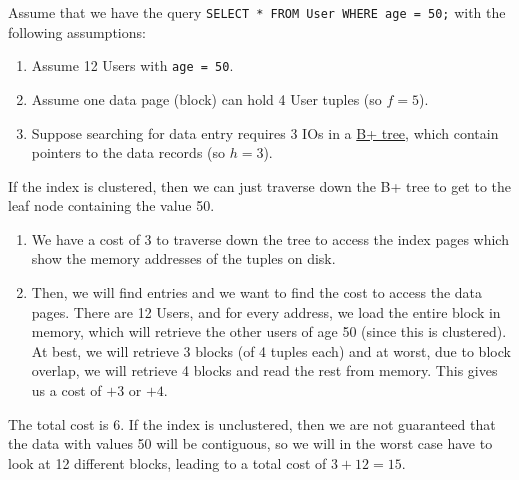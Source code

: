   \begin{example}
    \label{ex:choosing-an-index-for-an-equality-query}
    Assume that we have the query \texttt{SELECT * FROM User WHERE age = 50;} with the following assumptions: 
    \begin{enumerate}
      \item Assume 12 Users with \texttt{age = 50}. 
      \item Assume one data page (block) can hold 4 User tuples (so $f = 5$). 
      \item Suppose searching for data entry requires 3 IOs in a \hyperref[def:b-tree-2]{B+ tree}, which contain pointers to the data records (so $h = 3$). 
    \end{enumerate}

    If the index is clustered, then we can just traverse down the B+ tree to get to the leaf node containing the value 50. 
    \begin{enumerate}
      \item We have a cost of 3 to traverse down the tree to access the index pages which show the memory addresses of the tuples on disk. 

      \item Then, we will find entries and we want to find the cost to access the data pages. There are 12 Users, and for every address, we load the entire block in memory, which will retrieve the other users of age 50 (since this is clustered). At best, we will retrieve 3 blocks (of 4 tuples each) and at worst, due to block overlap, we will retrieve 4 blocks and read the rest from memory. This gives us a cost of $+3$ or $+4$. 
    \end{enumerate}
    The total cost is 6. If the index is unclustered, then we are not guaranteed that the data with values 50 will be contiguous, so we will in the worst case have to look at 12 different blocks, leading to a total cost of $3 + 12 = 15$. 
  \end{example}

